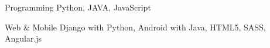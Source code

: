 


\begin{cvskills}


\cvskill
{Programming} %
{Python, JAVA, JavaScript} %


\cvskill
{Web \& Mobile} %
{Django with Python, Android with Java, HTML5, SASS, Angular.js} %



\end{cvskills}
